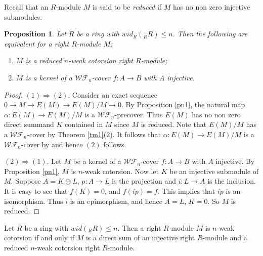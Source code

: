 ﻿\documentclass[
11pt,%
tightenlines,%
twoside,%
onecolumn,%
nofloats,%
nobibnotes,%
nofootinbib,%
superscriptaddress,%
noshowpacs,%
centertags]%
{revtex4}
\newtheorem{proposition}{Proposition}
\begin{document}
 Recall that an $R$-module $M$ is said to be \textit{reduced} \cite{Eno} if $M$ has
  no non zero injective submodules.
\begin{proposition}\label{pn2}
Let $R$ be a ring with $wid_R(_RR) \leq n$. Then the following are equivalent for a right $R$-module $M$:
\begin{enumerate}
 \item $M$ is a reduced $n$-weak cotorsion right $R$-module;
 \item $M$ is a kernel of a $\mathcal{WF}_n$-cover $f \colon A \rightarrow B$ with $A$ injective.
\end{enumerate}
\end{proposition}

\begin{proof}
$(1) \Rightarrow (2)$. Consider an exact sequence $0 \rightarrow M
\rightarrow E(M) \rightarrow  E(M)/M \rightarrow 0$. By Proposition
\ref{pn1}, the natural map $\alpha \colon E(M) \rightarrow E(M)/M$
is a $\mathcal{WF}_n$-precover. Thus $E(M)$ has no non zero direct
summand $K$ contained in $M$ since $M$ is reduced. Note that
$E(M)/M$ has a $\mathcal{WF}_n$-cover by Theorem \ref{tm1}(2). It
follows that $\alpha \colon E(M) \rightarrow E(M)/M$ is a
$\mathcal{WF}_n$-cover by \cite[Corollary ~1.2.8]{Xu} and hence
$(2)$ follows.
\par $(2) \Rightarrow (1)$. Let $M$ be a kernel of a $\mathcal{WF}_n$-cover
 $f \colon A \rightarrow B$ with $A$ injective. By Proposition \ref{pn1}, $M$ is $n$-weak cotorsion. Now let $K$ be an injective submodule of $M$. Suppose $A = K \oplus L$, $p \colon A \rightarrow L$ is the projection and $i \colon L \rightarrow A$ is the inclusion. It is easy to see that  $f(K) = 0$, and $f(ip) = f$. This implies that $ip$ is an isomorphism. Thus $i$ is an epimorphism, and hence $A = L$, $K = 0$. So $M$ is reduced.
\end{proof}

\begin{theorem}
Let $R$ be a ring with $wid(_RR) \leq n$. Then a right $R$-module
$M$ is  $n$-weak cotorsion if and only if $M$ is a direct sum of an
injective right $R$-module and a reduced $n$-weak cotorsion right
$R$-module.
\end{theorem}
\end{document}

